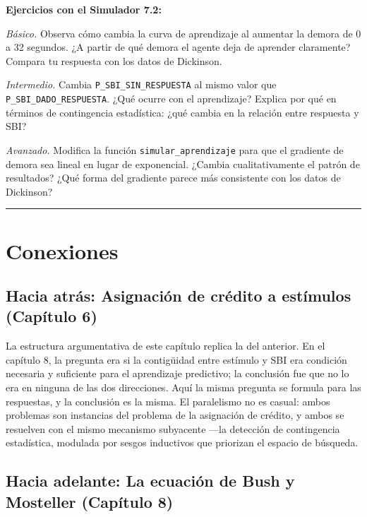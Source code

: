 \documentclass[
  letterpaper,
  DIV=11,
  numbers=noendperiod]{scrreprt}
\begin{document}
\begin{tcolorbox}[enhanced jigsaw, toprule=.15mm, arc=.35mm, colback=white, opacityback=0, colframe=quarto-callout-note-color-frame, breakable, rightrule=.15mm, left=2mm, leftrule=.75mm, bottomrule=.15mm]
\textbf{Ejercicios con el Simulador 7.2:}

\emph{Básico.} Observa cómo cambia la curva de aprendizaje al aumentar
la demora de 0 a 32 segundos. ¿A partir de qué demora el agente deja de
aprender claramente? Compara tu respuesta con los datos de Dickinson.

\emph{Intermedio.} Cambia \texttt{P\_SBI\_SIN\_RESPUESTA} al mismo valor
que \texttt{P\_SBI\_DADO\_RESPUESTA}. ¿Qué ocurre con el aprendizaje?
Explica por qué en términos de contingencia estadística: ¿qué cambia en
la relación entre respuesta y SBI?

\emph{Avanzado.} Modifica la función \texttt{simular\_aprendizaje} para
que el gradiente de demora sea lineal en lugar de exponencial. ¿Cambia
cualitativamente el patrón de resultados? ¿Qué forma del gradiente
parece más consistente con los datos de Dickinson?

\begin{center}\rule{0.5\linewidth}{0.5pt}\end{center}

\section{Conexiones}\label{conexiones-2}

\subsection{Hacia atrás: Asignación de crédito a estímulos (Capítulo
6)}\label{hacia-atruxe1s-asignaciuxf3n-de-cruxe9dito-a-estuxedmulos-capuxedtulo-6}

La estructura argumentativa de este capítulo replica la del anterior. En
el capítulo 8, la pregunta era si la contigüidad entre estímulo y SBI
era condición necesaria y suficiente para el aprendizaje predictivo; la
conclusión fue que no lo era en ninguna de las dos direcciones. Aquí la
misma pregunta se formula para las respuestas, y la conclusión es la
misma. El paralelismo no es casual: ambos problemas son instancias del
problema de la asignación de crédito, y ambos se resuelven con el mismo
mecanismo subyacente ---la detección de contingencia estadística,
modulada por sesgos inductivos que priorizan el espacio de búsqueda.

\subsection{Hacia adelante: La ecuación de Bush y Mosteller (Capítulo
8)}\label{hacia-adelante-la-ecuaciuxf3n-de-bush-y-mosteller-capuxedtulo-8}


\end{tcolorbox}
\end{document}
